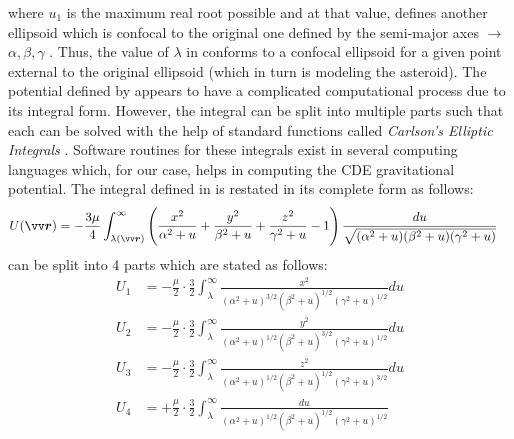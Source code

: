 where $u_1$ is the maximum real root possible and at that value,  defines another ellipsoid which is confocal to the original one defined by the semi-major axes $\rightarrow$ $\alpha, \beta, \gamma$ \parencite{ellipsoid_potential_model}. Thus, the value of $\lambda$ in  conforms to a confocal ellipsoid for a given point external to the original ellipsoid (which in turn is modeling the asteroid).
%
\newline\newline
%
The potential defined by  appears to have a complicated computational process due to its integral form. However, the integral can be split into multiple parts such that each can be solved with the help of standard functions called \textit{Carlson's Elliptic Integrals} \parencite{carlsonEllipticIntegral}. Software routines for these integrals exist in several computing languages which, for our case, helps in computing the \gls{CDE} gravitational potential. The integral defined in  is restated in its complete form as follows:
\begin{align}
    U(\bvector{r}) &= -\frac{3\mu}{4} \int_{\lambda(\bvector{r})}^{\infty} \left(\frac{x^2}{\alpha^2 + u} + \frac{y^2}{\beta^2 + u} + \frac{z^2}{\gamma^2 + u} - 1\right) \frac{du}{\sqrt{(\alpha^2 + u)(\beta^2 + u)(\gamma^2 + u)}}
    \label{eqn:ellipsoid_potential_long_form}
\end{align}
 can be split into 4 parts which are stated as follows:
\begin{align}
    U_1 &= -\frac{\mu}{2} \cdotp \frac{3}{2} \int_{\lambda}^{\infty} \frac{x^2}{(\alpha^2 + u)^{3/2}(\beta^2 + u)^{1/2}(\gamma^2 + u)^{1/2}} du
    \label{eqn:ellipsoid_potential_split_1}\\
    U_2 &= -\frac{\mu}{2} \cdotp \frac{3}{2} \int_{\lambda}^{\infty} \frac{y^2}{(\alpha^2 + u)^{1/2}(\beta^2 + u)^{3/2}(\gamma^2 + u)^{1/2}} du
    \label{eqn:ellipsoid_potential_split_2}\\
    U_3 &= -\frac{\mu}{2} \cdotp \frac{3}{2} \int_{\lambda}^{\infty} \frac{z^2}{(\alpha^2 + u)^{1/2}(\beta^2 + u)^{1/2}(\gamma^2 + u)^{3/2}} du
    \label{eqn:ellipsoid_potential_split_3}\\
    U_4 &= +\frac{\mu}{2} \cdotp \frac{3}{2} \int_{\lambda}^{\infty} \frac{du}{(\alpha^2 + u)^{1/2}(\beta^2 + u)^{1/2}(\gamma^2 + u)^{1/2}}
    \label{eqn:ellipsoid_potential_split_4}
\end{align}
